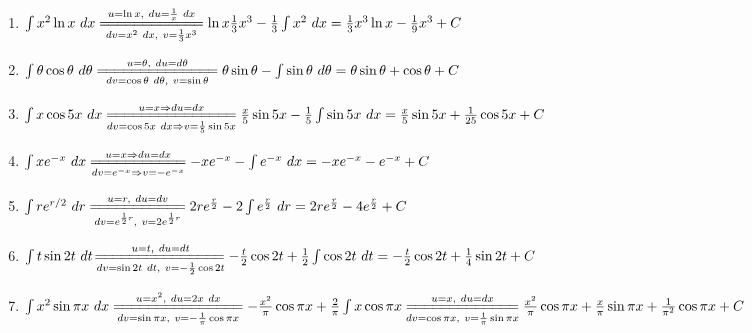 \documentclass[a4]{article}
\begin{document}
\begin{enumerate}[label={\bf{}\arabic*}.]
\item%
	$\int x^2\ln x\ dx\overset{u=\ln x,\ du=\frac{1}{x}\ dx}{\underset{dv=x^2\ dx,\ v=\frac{1}{3}x^3}{=\joinrel=\joinrel=\joinrel=\joinrel=\joinrel=\joinrel=\joinrel=\joinrel=\joinrel=\joinrel=\joinrel=}}\ln x\frac{1}{3}x^3-\frac{1}{3}\int x^2\ dx=\frac{1}{3}x^3\ln x-\frac{1}{9}x^3+C$

\item%
	$\int\theta\cos\theta\ d\theta\overset{u=\theta,\ du=d\theta}{\underset{dv=\cos\theta\ d\theta,\ v=\sin\theta}{=\joinrel=\joinrel=\joinrel=\joinrel=\joinrel=\joinrel=\joinrel=\joinrel=\joinrel=\joinrel=\joinrel=\joinrel=\joinrel=}}
\theta\sin\theta-\int\sin\theta\ d\theta=\theta\sin\theta+\cos\theta+C$

\item%
	$\int x\cos 5x\ dx\underset{dv=\cos5x\ dx\Rightarrow v=\frac{1}{5}\sin5x}{\overset{u=x\Rightarrow du=dx}{=\joinrel=\joinrel=\joinrel=\joinrel=\joinrel=\joinrel=\joinrel=\joinrel=\joinrel=\joinrel=\joinrel=\joinrel=\joinrel=\joinrel=}}\frac{x}{5}\sin5x-\frac{1}{5}\int\sin5x\ dx=\frac{x}{5}\sin5x+\frac{1}{25}\cos5x+C$

\item%
	$\int xe^{-x}\ dx\overset{u=x\Rightarrow du=dx}{\underset{dv=e^{-x}\Rightarrow v=-e^{-x}}{=\joinrel=\joinrel=\joinrel=\joinrel=\joinrel=\joinrel=\joinrel=\joinrel=\joinrel=\joinrel=}}-xe^{-x}-\int e^{-x}\ dx=-xe^{-x}-e^{-x}+C$

\item%
	$\int re^{r/2}\ dr\overset{u=r,\ du=dv}{\underset{dv=e^{\frac{1}{2}r},\ v=2e^{\frac{1}{2}r}}{=\joinrel=\joinrel=\joinrel=\joinrel=\joinrel=\joinrel=\joinrel=\joinrel=\joinrel=\joinrel=}}2re^{\frac{r}{2}}-2\int e^\frac{r}{2}\ dr=2re^\frac{r}{2}-4e^\frac{r}{2}+C$

\item%
	$\int t\sin2t\ dt\overset{u=t,\ du=dt}{\underset{dv=\sin2t\ dt,\ v=-\frac{1}{2}\cos2t}{\joinrel=\joinrel=\joinrel=\joinrel=\joinrel=\joinrel=\joinrel=\joinrel=\joinrel=\joinrel=\joinrel=\joinrel=\joinrel=\joinrel=\joinrel=}}-\frac{t}{2}\cos2t+\frac{1}{2}\int\cos2t\ dt=-\frac{t}{2}\cos2t+\frac{1}{4}\sin2t+C$

\item%
	$\int x^2\sin\pi x\ dx\overset{u=x^2,\ du=2x\ dx}{\underset{dv=\sin\pi x,\ v=-\frac{1}{\pi}\cos\pi x}{=\joinrel=\joinrel=\joinrel=\joinrel=\joinrel=\joinrel=\joinrel=\joinrel=\joinrel=\joinrel=\joinrel=\joinrel=\joinrel=\joinrel=}}-\frac{x^2}{\pi}\cos\pi x+\frac{2}{\pi}\int x\cos\pi x\overset{u=x,\ du=dx}{\underset{dv=\cos\pi x,\ v=\frac{1}{\pi}\sin\pi x}{=\joinrel=\joinrel=\joinrel=\joinrel=\joinrel=\joinrel=\joinrel=\joinrel=\joinrel=\joinrel=\joinrel=\joinrel=}}\frac{x^2}{\pi}\cos\pi x+\frac{x}{\pi}\sin\pi x+\frac{1}{\pi^2}\cos\pi x+C$


\end{enumerate}
\end{document}

